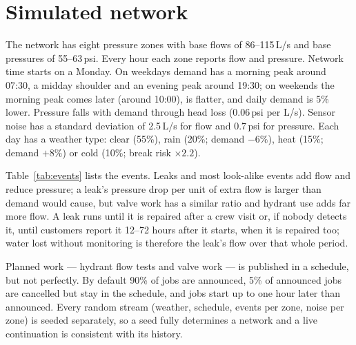 \documentclass[11pt,a4paper]{article}
\begin{document}
\section{Simulated network}
\label{sec:sim}

The network has eight pressure zones with base flows of 86--115\,L/s and base pressures of 55--63\,psi. Every hour each zone reports flow and pressure. Network time starts on a Monday. On weekdays demand has a morning peak around 07:30, a midday shoulder and an evening peak around 19:30; on weekends the morning peak comes later (around 10:00), is flatter, and daily demand is 5\% lower. Pressure falls with demand through head loss (0.06\,psi per L/s). Sensor noise has a standard deviation of 2.5\,L/s for flow and 0.7\,psi for pressure. Each day has a weather type: clear (55\%), rain (20\%; demand $-6\%$), heat (15\%; demand $+8\%$) or cold (10\%; break risk $\times 2.2$).

Table~\ref{tab:events} lists the events. Leaks and most look-alike events add flow and reduce pressure; a leak's pressure drop per unit of extra flow is larger than demand would cause, but valve work has a similar ratio and hydrant use adds far more flow. A leak runs until it is repaired after a crew visit or, if nobody detects it, until customers report it 12--72 hours after it starts, when it is repaired too; water lost without monitoring is therefore the leak's flow over that whole period.

Planned work --- hydrant flow tests and valve work --- is published in a schedule, but not perfectly. By default 90\% of jobs are announced, 5\% of announced jobs are cancelled but stay in the schedule, and jobs start up to one hour later than announced. Every random stream (weather, schedule, events per zone, noise per zone) is seeded separately, so a seed fully determines a network and a live continuation is consistent with its history.
\end{document}
